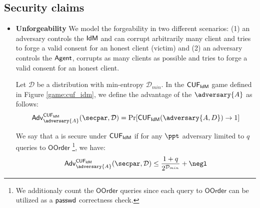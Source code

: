 \subsection{Security claims}
\begin{itemize}
    \item \textbf{Unforgeability} We model the forgeability in two different scenarios: (1) an adversary controls the $\textsf{IdM}$ and can corrupt arbitrarily many client and tries to forge a valid consent for an honest client (victim) and (2) an adversary controls the $\textsf{Agent}$, corrupts as many clients as possible and tries to forge a valid consent for an honest client.


    \begin{definition}
    Let $\mathcal{D}$ be a distribution with min-entropy $\mathcal{D}_{min}$.
    In the $\mathsf{CUF}_{\textsf{IdM}}$ game defined in Figure \ref{game:cuf_idm}, we define the advantage of the $\adversary{A}$ as follows:
    \begin{align*}
    \advtg_\adversary{A}^{\cuf_\idm}(\secpar, \mathcal{D}) = \Pr[\cuf_\idm(\adversary{A, D}) \rightarrow 1] 
    \end{align*}

We say that a \primitive is secure under $\mathsf{CUF}_{\textsf{IdM}}$ if for any $\ppt$ adversary  limited to $q$ queries to $\mathsf{OOrder}$ \footnote{We additionaly count the $\mathsf{OOrder}$ queries since each query to $\mathsf{OOrder}$ can be utilized as a $\textsf{passwd}$ correctness check.}, we have:
\begin{align*}
    \advtg_\adversary{A}^{\cuf_\idm}(\secpar, \mathcal{D})  \le \frac{1+q}{2^{\mathcal{D}_{min}}} + \negl
\end{align*}

\begin{figure*}
\scalebox{.9}{
\begin{pchstack}[center, space=0.2cm, boxed]
    \begin{pcvstack}
    

\end{pcvstack}
\end{pchstack}}
\end{figure*}
\end{definition}
\end{itemize}
